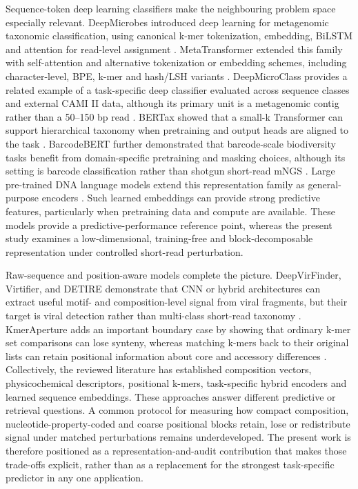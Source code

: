 Sequence-token deep learning classifiers make the neighbouring problem space especially relevant. DeepMicrobes introduced deep learning for metagenomic taxonomic classification, using canonical k-mer tokenization, embedding, BiLSTM and attention for read-level assignment \citep{Liang2020}. MetaTransformer extended this family with self-attention and alternative tokenization or embedding schemes, including character-level, BPE, k-mer and hash/LSH variants \citep{Wichmann2023}. DeepMicroClass provides a related example of a task-specific deep classifier evaluated across sequence classes and external CAMI II data, although its primary unit is a metagenomic contig rather than a 50--150 bp read \citep{Hou2024DeepMicroClass}. BERTax showed that a small-k Transformer can support hierarchical taxonomy when pretraining and output heads are aligned to the task \citep{BERTax2022}. BarcodeBERT further demonstrated that barcode-scale biodiversity tasks benefit from domain-specific pretraining and masking choices, although its setting is barcode classification rather than shotgun short-read mNGS \citep{BarcodeBERT2026}. Large pre-trained DNA language models extend this representation family as general-purpose encoders \citep{Zhou2024,DallaTorre2025,Nguyen2023,Nguyen2024Evo,Fishman2025}. Such learned embeddings can provide strong predictive features, particularly when pretraining data and compute are available. These models provide a predictive-performance reference point, whereas the present study examines a low-dimensional, training-free and block-decomposable representation under controlled short-read perturbation.

Raw-sequence and position-aware models complete the picture. DeepVirFinder, Virtifier, and DETIRE demonstrate that CNN or hybrid architectures can extract useful motif- and composition-level signal from viral fragments, but their target is viral detection rather than multi-class short-read taxonomy \citep{DeepVirFinder2020,Virtifier2022,DETIRE2023}. KmerAperture adds an important boundary case by showing that ordinary k-mer set comparisons can lose synteny, whereas matching k-mers back to their original lists can retain positional information about core and accessory differences \citep{KmerAperture2024}. Collectively, the reviewed literature has established composition vectors, physicochemical descriptors, positional k-mers, task-specific hybrid encoders and learned sequence embeddings. These approaches answer different predictive or retrieval questions. A common protocol for measuring how compact composition, nucleotide-property-coded and coarse positional blocks retain, lose or redistribute signal under matched perturbations remains underdeveloped. The present work is therefore positioned as a representation-and-audit contribution that makes those trade-offs explicit, rather than as a replacement for the strongest task-specific predictor in any one application.

